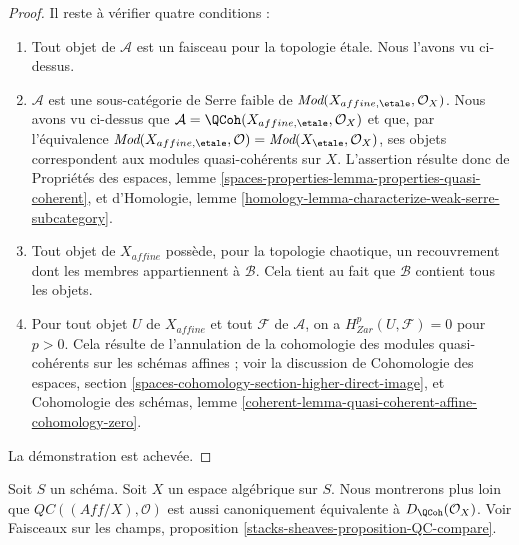 \begin{proof}
\medskip\noindent
Il reste \`a v\'erifier quatre conditions :
\begin{enumerate}
\item Tout objet de $\mathcal{A}$ est un faisceau pour la topologie \'etale.
Nous l'avons vu ci-dessus.
\item $\mathcal{A}$ est une sous-cat\'egorie de Serre faible de
$\textit{Mod}(X_{affine,\etale},\mathcal{O}_X)$. Nous avons vu ci-dessus que
$\mathcal{A}=\QCoh(X_{affine,\etale},\mathcal{O}_X)$ et que, par
l'\'equivalence
$\textit{Mod}(X_{affine,\etale},\mathcal{O})=
\textit{Mod}(X_\etale,\mathcal{O}_X)$, ses objets correspondent aux modules
quasi-coh\'erents sur $X$. L'assertion r\'esulte donc de Propri\'et\'es des
espaces, lemme \ref{spaces-properties-lemma-properties-quasi-coherent}, et
d'Homologie, lemme
\ref{homology-lemma-characterize-weak-serre-subcategory}.
\item Tout objet de $X_{affine}$ poss\`ede, pour la topologie chaotique, un
recouvrement dont les membres appartiennent \`a $\mathcal{B}$. Cela tient au
fait que $\mathcal{B}$ contient tous les objets.
\item Pour tout objet $U$ de $X_{affine}$ et tout $\mathcal{F}$ de
$\mathcal{A}$, on a $H^p_{Zar}(U,\mathcal{F})=0$ pour $p>0$. Cela r\'esulte de
l'annulation de la cohomologie des modules quasi-coh\'erents sur les sch\'emas
affines ; voir la discussion de Cohomologie des espaces, section
\ref{spaces-cohomology-section-higher-direct-image}, et Cohomologie des
sch\'emas, lemme
\ref{coherent-lemma-quasi-coherent-affine-cohomology-zero}.
\end{enumerate}
La d\'emonstration est achev\'ee.
\end{proof}

\begin{remark}
\label{remark-QC-compare}
Soit $S$ un sch\'ema. Soit $X$ un espace alg\'ebrique sur $S$.
Nous montrerons plus loin que
$\mathit{QC}((\textit{Aff}/X),\mathcal{O})$ est aussi canoniquement
\'equivalente \`a $D_\QCoh(\mathcal{O}_X)$. Voir Faisceaux sur les champs,
proposition \ref{stacks-sheaves-proposition-QC-compare}.
\end{remark}












